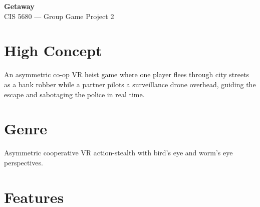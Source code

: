 \documentclass[12pt]{article}
\begin{document}
\begin{center}
    {\LARGE \textbf{Getaway}}\\[0.3em]
    {\large CIS 5680 --- Group Game Project 2}
\end{center}

\section{High Concept}

An asymmetric co-op VR heist game where one player flees through city streets as a bank robber while a partner pilots a surveillance drone overhead, guiding the escape and sabotaging the police in real time.

\section{Genre}

Asymmetric cooperative VR action-stealth with bird's eye and worm's eye perspectives.

\section{Features}
\end{document}
